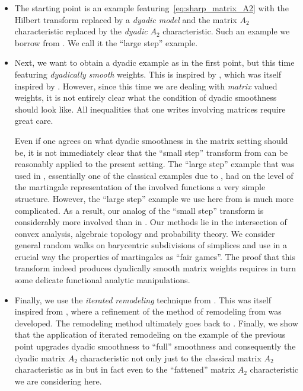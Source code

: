 \documentclass{amsart}
\theoremstyle{definition}
\theoremstyle{remark}
\begin{document}
\begin{itemize}
    \item The starting point is an example featuring~\eqref{eq:sharp_matrix_A2} with the Hilbert transform replaced by a \emph{dyadic model} and the matrix $A_2$ characteristic replaced by the \emph{dyadic} $A_2$ characteristic. Such an example we borrow from \cite{DoPeTrVo}. We call it the ``large step'' example.

    \item Next, we want to obtain a dyadic example as in the first point, but this time featuring \emph{dyadically smooth} weights. This is inspired by \cite{KaTr}, which was itself inspired by \cite{Na}. However, since this time we are dealing with \emph{matrix} valued weights, it is not entirely clear what the condition of dyadic smoothness should look like. All inequalities that one writes involving matrices require great care.

    Even if one agrees on what dyadic smoothness in the matrix setting should be, it is not immediately clear that the ``small step'' transform from \cite{KaTr} can be reasonably applied to the present setting. The ``large step'' example that was used in \cite{KaTr}, essentially one of the classical examples due to \cite{Bu}, had on the level of the martingale representation of the involved functions a very simple structure. However, the ``large step'' example we use here from \cite{DoPeTrVo} is much more complicated. As a result, our analog of the ``small step'' transform is considerably more involved than in \cite{KaTr}. Our methods lie in the intersection of convex analysis, algebraic topology and probability theory. We consider general random walks on barycentric subdivisions of simplices and use in a crucial way the properties of martingales as ``fair games''. The proof that this transform indeed produces dyadically smooth matrix weights requires in turn some delicate functional analytic manipulations.

    \item Finally, we use the \emph{iterated remodeling} technique from \cite{DoPeTrVo}. This was itself inspired from \cite{KaTr}, where a refinement of the method of remodeling from \cite{Na} was developed. The remodeling method ultimately goes back to \cite{Bo}. Finally, we show that the application of iterated remodeling on the example of the previous point upgrades dyadic smoothness to ``full'' smoothness and consequently the dyadic matrix $A_2$ characteristic not only just to the classical matrix $A_2$ characteristic as in \cite{DoPeTrVo} but in fact even to the ``fattened'' matrix $A_2$ characteristic we are considering here.
\end{itemize}
\end{document}
